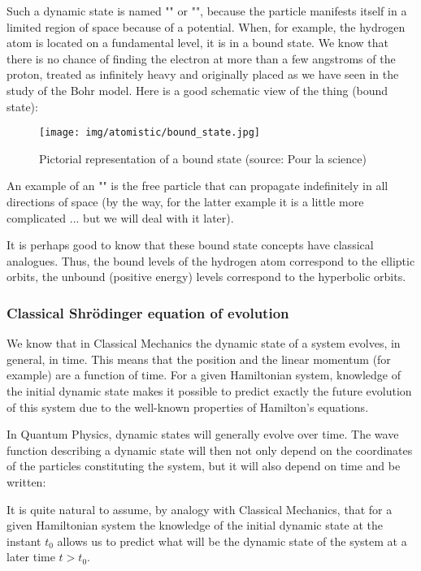 	Such a dynamic state is named "" or "", because the particle manifests itself in a limited region of space because of a potential. When, for example, the hydrogen atom is located on a fundamental level, it is in a bound state. We know that there is no chance of finding the electron at more than a few angstroms of the proton, treated as infinitely heavy and originally placed as we have seen in the study of the Bohr model. Here is a good schematic view of the thing (bound state):
	\begin{figure}[H]
		\centering
		\texttt{[image: img/atomistic/bound\_state.jpg]}	
		\caption{Pictorial representation of a bound state (source: Pour la science)}
	\end{figure}
	An example of an "" is the free particle that can propagate indefinitely in all directions of space (by the way, for the latter example it is a little more complicated ... but we will deal with it later).
	\begin{tcolorbox}[title=Remark,colframe=black,arc=10pt]
	It is perhaps good to know that these bound state concepts have classical analogues. Thus, the bound levels of the hydrogen atom correspond to the elliptic orbits, the unbound (positive energy) levels correspond to the hyperbolic orbits.
	\end{tcolorbox}
	
	\subsubsection{Classical Shrödinger equation of evolution}
	We know that in Classical Mechanics the dynamic state of a system evolves, in general, in time. This means that the position and the linear momentum (for example) are a function of time. For a given Hamiltonian system, knowledge of the initial dynamic state makes it possible to predict exactly the future evolution of this system due to the well-known properties of Hamilton's equations.
	
	In Quantum Physics, dynamic states will generally evolve over time. The wave function describing a dynamic state will then not only depend on the coordinates of the particles constituting the system, but it will also depend on time and be written:
	
	It is quite natural to assume, by analogy with Classical Mechanics, that for a given Hamiltonian system the knowledge of the initial dynamic state at the instant $t_0$ allows us to predict what will be the dynamic state of the system at a later time $t>t_0$.
	
